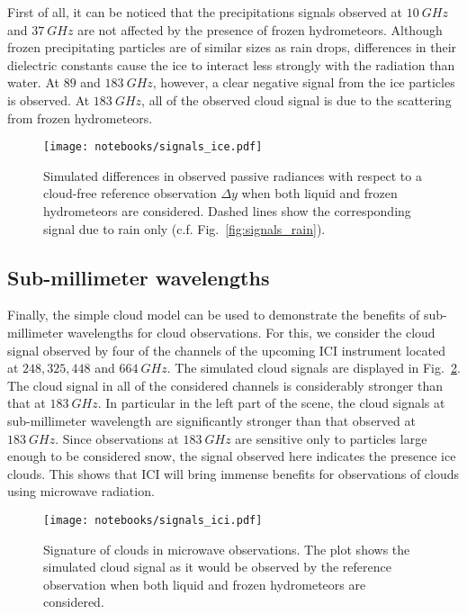 First of all, it can be noticed that the precipitations signals observed at
$10\ \unit{GHz}$ and $37\ \unit{GHz}$ are not affected by the presence of frozen
hydrometeors. Although frozen precipitating particles are of similar sizes as
rain drops, differences in their dielectric constants cause the ice to interact
less strongly with the radiation than water. At $89$ and $183\ \unit{GHz}$,
however, a clear negative signal from the ice particles is observed. At
$183\ \unit{GHz}$, all of the observed cloud signal is due to the scattering
from frozen hydrometeors.

\begin{figure}
\texttt{[image: notebooks/signals\_ice.pdf]}
\caption{Simulated differences in observed passive radiances with respect
  to a cloud-free reference observation $\Delta y$ when both liquid and frozen
  hydrometeors are considered. Dashed lines show the corresponding signal due to
  rain only (c.f. Fig.~\ref{fig:signals_rain}).}
\label{fig:signals_ice}
\end{figure}

\subsection{Sub-millimeter wavelengths}

Finally, the simple cloud model can be used to demonstrate the benefits of
sub-millimeter wavelengths for cloud observations. For this, we consider the
cloud signal observed by four of the channels of the upcoming ICI instrument
located at $248, 325, 448$ and $664\ \unit{GHz}$. The simulated cloud signals
are displayed in Fig.~\ref{fig:signals_ici}. The cloud signal in all of the
considered channels is considerably stronger than that at $183\ \unit{GHz}$. In
particular in the left part of the scene, the cloud signals at sub-millimeter
wavelength are significantly stronger than that observed at $183\ \unit{GHz}$.
Since observations at $183\ \unit{GHz}$ are sensitive only to particles large
enough to be considered snow, the signal observed here indicates the presence
ice clouds. This shows that ICI will bring immense benefits for observations
of clouds using microwave radiation.
\begin{figure}
\texttt{[image: notebooks/signals\_ici.pdf]}
\caption{Signature of clouds in microwave observations. The plot shows the
  simulated cloud signal as it would be observed by the
  reference observation when both liquid and frozen hydrometeors are
  considered.}
\label{fig:signals_ici}
\end{figure}

